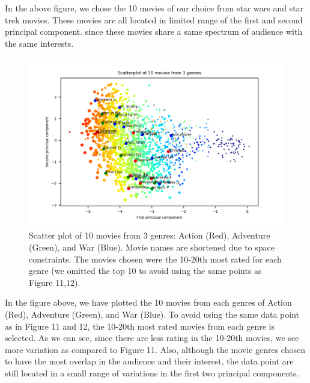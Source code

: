 In the above figure, we chose the 10 movies of our choice from star wars and star trek movies. These movies are all located in limited range of the first and second principal component. since these movies share a same spectrum of audience with the same interests. 

\begin{figure}[H]
	\centering
	\includegraphics[width=1.0\textwidth]{3Genres.png}
	\caption{Scatter plot of 10 movies from 3 genres: Action (Red), Adventure (Green), and War (Blue). Movie names are shortened due to space constraints. The movies chosen were the 10-20th most rated for each genre (we omitted the top 10 to avoid using the same points as Figure 11,12).}
\end{figure}

In the figure above, we have plotted the 10 movies from each genres of Action (Red), Adventure (Green), and War (Blue). To avoid using the same data point as in Figure 11 and 12, the 10-20th most rated movies from each genre is selected. As we can see, since there are less rating in the 10-20th movies, we see more variation as compared to Figure 11. Also, although the movie genres chosen to have the most overlap in the audience and their interest, the data point are still located in a small range of variations in the first two principal components.


